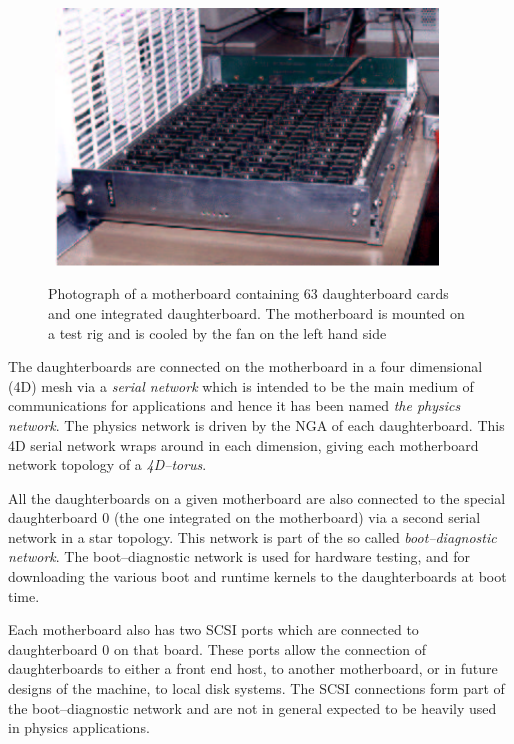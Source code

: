 \begin{figure}[ht]
\begin{center}
\leavevmode
\hbox{%
\includegraphics[width=4in]{motherboard_photo}
}
\end{center}
\caption{Photograph of a motherboard containing 63 daughterboard cards and
one integrated daughterboard. The motherboard is mounted on a test rig and 
is cooled by the fan on the left hand side}
\label{f:motherBoard}
\end{figure}

The daughterboards are connected on the motherboard in a four dimensional 
(4D) mesh via a {\em serial network} which is intended to be the main 
medium of communications for applications and hence it has been named
{\em the physics network}. The physics network is driven by the NGA 
of each daughterboard. This 4D serial network wraps around in each dimension,
giving each motherboard network topology of a {\em 4D--torus}.

All the daughterboards on a given motherboard are also connected to the 
special daughterboard 0 (the one integrated on the motherboard) via
a second serial network in a star topology. This network is part
of the so called {\em boot--diagnostic network}. The boot--diagnostic
network is used for hardware testing, and for downloading the various
boot and runtime kernels to the daughterboards at boot time. 

Each motherboard also has two SCSI ports which are connected to
daughterboard 0 on that board. These ports allow the connection of
daughterboards to either a front end host, to another motherboard, or
in future designs of the machine, to local disk systems. The SCSI
connections form part of the boot--diagnostic network and are not in
general expected to be heavily used in physics applications.

